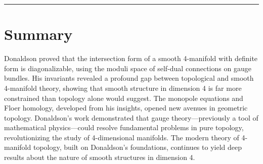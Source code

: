 \begin{center}\rule{0.5\linewidth}{0.5pt}\end{center}

\section*{Summary}

Donaldson proved that the intersection form of a smooth 4-manifold with definite form is diagonalizable, using the moduli space of self-dual connections on gauge bundles. His invariants revealed a profound gap between topological and smooth 4-manifold theory, showing that smooth structure in dimension 4 is far more constrained than topology alone would suggest. The monopole equations and Floer homology, developed from his insights, opened new avenues in geometric topology. Donaldson's work \cite{donaldson1983} demonstrated that gauge theory---previously a tool of mathematical physics---could resolve fundamental problems in pure topology, revolutionizing the study of 4-dimensional manifolds. The modern theory of 4-manifold topology, built on Donaldson's foundations, continues to yield deep results about the nature of smooth structures in dimension 4.

